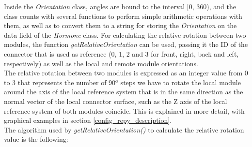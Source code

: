 Inside the \emph{Orientation} class, angles are bound to the interval [0, 360), and the class counts with several functions to perform simple arithmetic operations with them, as well as to convert them to a string for storing the \emph{Orientation} on the data field of the \emph{Hormone} class. For calculating the relative rotation between two modules, the function \emph{getRelativeOrientation} can be used, passing it the ID of the connector that is used as reference (0, 1, 2 and 3 for front, right, back and left, respectively) as well as the local and remote module orientations.\\

The relative rotation between two modules is expressed as an integer value from 0 to 3 that represents the number of 90º steps we have to rotate the local module around the axis of the local reference system that is in the same direction as the normal vector of the local connector surface, such as the Z axis of the local reference system of both modules coincide. This is explained in more detail, with graphical examples in section \ref{config_repy_description}.\\

The algorithm used by \emph{getRelativeOrientation()} to calculate the relative rotation value is the following:

